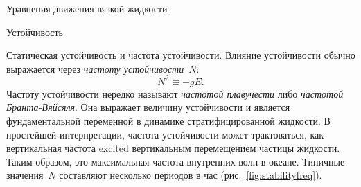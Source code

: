 \begin{chapter}{Уравнения движения вязкой жидкости}
\begin{section}{Устойчивость}
\begin{paragraph}{Статическая устойчивость и частота устойчивости.}
Влияние устойчивости обычно выражается через 
\emph{частоту устойчивости}~$N$:
\begin{equation}\label{eq:8.36}
 N^2 \equiv -g E.
\end{equation}
Частоту устойчивости нередко называют 
\emph{частотой плавучести} 
либо \emph{частотой Бранта-Вяйсяля}. 
Она выражает величину устойчивости и является фундаментальной 
переменной в динамике стратифицированной жидкости. 
В простейшей интерпретации, частота устойчивости может трактоваться, как
вертикальная частота excited вертикальным перемещением
частицы жидкости. Таким образом, это максимальная частота внутренних
волн в океане. Типичные значения~$N$ составляют несколько периодов в час
(рис.~\ref{fig:stabilityfreq}).
%
\end{paragraph}


\end{section}
\end{chapter}
